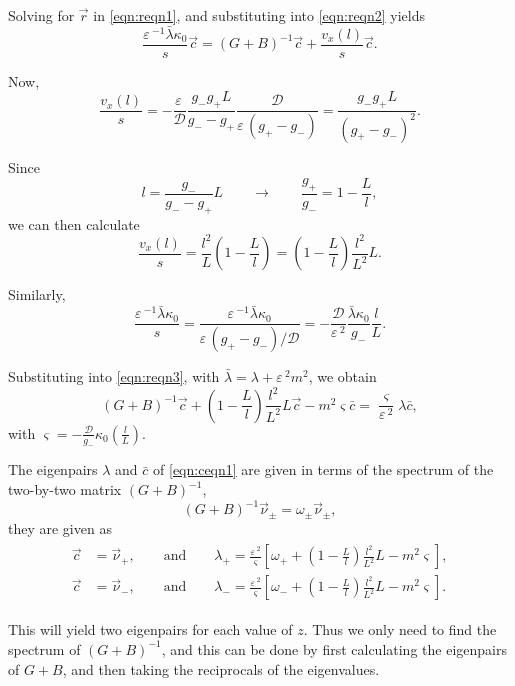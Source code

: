 \documentclass[a4paper,10pt]{article}
\newcommand{\lA}{\ensuremath{\lambda}}
\newcommand{\vA}{\ensuremath{\varsigma}}
\newcommand{\kA}{\ensuremath{\kappa}}
\newcommand{\Ep}{\ensuremath{\varepsilon\,}}
\newcommand{\DD}{\ensuremath{\mathcal{D}}}
\begin{document}
Solving for $\vec{r}$ in \eqref{eqn:reqn1}, and substituting into \eqref{eqn:reqn2} yields
% 
\begin{equation}
\label{eqn:reqn3}
 \frac{\Ep^{-1}\bar{\lA}\kA_0}{s}\vec{c} = (G+B)^{-1}\vec{c} + \frac{v_x(l)}{s}\vec{c}.
\end{equation}
% 

Now, 
% 
\[
  \frac{v_x(l)}{s} = -\frac{\Ep}{\DD}\frac{g_-g_+L}{g_--g_+}\frac{\DD}{\Ep(g_+-g_-)} = \frac{g_-g_+L}{(g_+-g_-)^2}.
\]
% 

Since 
% 
\[
  l=\frac{g_-}{g_--g_+}L\qquad\rightarrow\qquad\frac{g_+}{g_-} = 1-\frac{L}{l},
\]
% 
we can then calculate
% 
\[
  \frac{v_x(l)}{s} = \frac{l^2}{L}\left(1-\frac{L}{l} \right) = \left(1-\frac{L}{l} \right)\frac{l^2}{L^2}L.
\]
% 

Similarly,
% 
\[
  \frac{\Ep^{-1}\bar{\lA}\kA_0}{s} = \frac{\Ep^{-1}\bar{\lA}\kA_0}{\Ep(g_+-g_-)/\DD} = -\frac{\DD}{\Ep^2}\frac{\bar{\lA}\kA_0}{g_-}\frac{l}{L}.
\]
% 

Substituting into \eqref{eqn:reqn3}, with $\bar{\lA} = \lA + \Ep^2m^2$, we obtain
% 
\begin{equation}
\label{eqn:ceqn1}
(G+B)^{-1}\vec{c} + \left(1- \frac{L}{l}\right)\frac{l^2}{L^2}L\vec{c} - m^2\vA\bar{c} = \frac{\vA}{\Ep^2}\lA\bar{c},
\end{equation}
% 
with $\vA = -\frac{\DD}{g_-}\kA_0\left(\frac{l}{L} \right)$.

The eigenpairs $\lA$ and $\bar{c}$ of \eqref{eqn:ceqn1} are given in terms of the spectrum of the two-by-two matrix $(G+B)^{-1}$, 
% 
\[
 (G+B)^{-1}\vec{\nu}_{\pm} = \omega_{\pm}\vec{\nu}_{\pm},
\]
% 
they are given as
% 
\begin{equation}
\label{eqn:lam2}
	\begin{split}
	\begin{aligned}
	  \vec{c} &= \vec{\nu}_+,\qquad\text{and}\qquad \lA_+ = \frac{\Ep^2}{\vA}\left[\omega_+ + \left(1- \frac{L}{l}\right)\frac{l^2}{L^2}L - m^2\vA \right],\\
	  \vec{c} &= \vec{\nu}_-,\qquad\text{and}\qquad \lA_- = \frac{\Ep^2}{\vA}\left[\omega_- + \left(1- \frac{L}{l}\right)\frac{l^2}{L^2}L - m^2\vA \right].
	\end{aligned}
	\end{split}
\end{equation}
%

This will yield two eigenpairs for each value of $z$. Thus we only need to find the spectrum of $(G+B)^{-1}$, and this can be done by first calculating the eigenpairs of $G+B$, and then taking the reciprocals of the eigenvalues.
\end{document}
